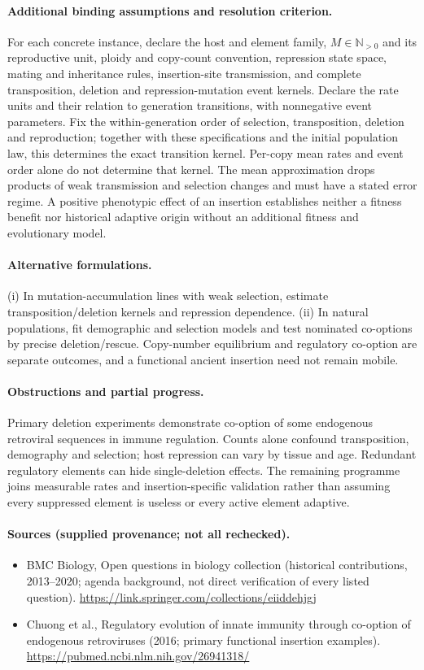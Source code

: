 \documentclass[11pt]{article}
\begin{document}
\paragraph{Additional binding assumptions and resolution criterion.} For each concrete instance, declare the host and element family, $M\in\mathbb{N}_{>0}$ and its reproductive unit, ploidy and copy-count convention, repression state space, mating and inheritance rules, insertion-site transmission, and complete transposition, deletion and repression-mutation event kernels. Declare the rate units and their relation to generation transitions, with nonnegative event parameters. Fix the within-generation order of selection, transposition, deletion and reproduction; together with these specifications and the initial population law, this determines the exact transition kernel. Per-copy mean rates and event order alone do not determine that kernel. The mean approximation drops products of weak transmission and selection changes and must have a stated error regime. A positive phenotypic effect of an insertion establishes neither a fitness benefit nor historical adaptive origin without an additional fitness and evolutionary model.

\paragraph{Alternative formulations.} (i) In mutation-accumulation lines with weak selection, estimate transposition/deletion kernels and repression dependence. (ii) In natural populations, fit demographic and selection models and test nominated co-options by precise deletion/rescue. Copy-number equilibrium and regulatory co-option are separate outcomes, and a functional ancient insertion need not remain mobile.
\paragraph{Obstructions and partial progress.} Primary deletion experiments demonstrate co-option of some endogenous retroviral sequences in immune regulation. Counts alone confound transposition, demography and selection; host repression can vary by tissue and age. Redundant regulatory elements can hide single-deletion effects. The remaining programme joins measurable rates and insertion-specific validation rather than assuming every suppressed element is useless or every active element adaptive.
\paragraph{Sources (supplied provenance; not all rechecked).}
\begin{itemize}
\item BMC Biology, Open questions in biology collection (historical contributions, 2013--2020; agenda background, not direct verification of every listed question). \url{https://link.springer.com/collections/eiiddehjgj}
\item Chuong et al., Regulatory evolution of innate immunity through co-option of endogenous retroviruses (2016; primary functional insertion examples). \url{https://pubmed.ncbi.nlm.nih.gov/26941318/}
\end{itemize}
\end{document}
